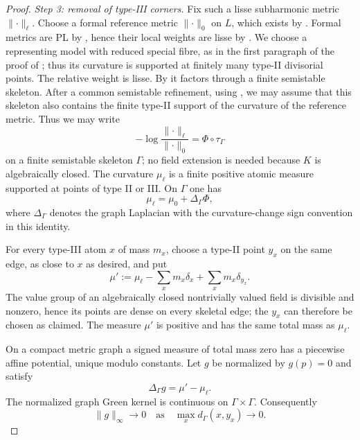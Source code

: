 \begin{proof}
\emph{Step 3: removal of type-III corners.}
Fix such a lisse subharmonic metric
\(\lVert\cdot\rVert_\ell\). Choose a formal reference metric
\(\lVert\cdot\rVert_0\) on \(L\), which exists by
\cite[\S2.2]{GM19}. Formal metrics are PL by
\cite[Prop.~2.10]{GM19}, hence their local weights are lisse by
\cite[Prop.~3.2.5]{Thu05}. We choose a representing model with reduced
special fibre, as in the first paragraph of the proof of
\cite[Prop.~5.1]{GR25PL}; thus its curvature is supported at finitely many
type-II divisorial points. The relative weight is
lisse. By \cite[Prop.~3.2.4]{Thu05} it factors through a finite semistable
skeleton. After a common semistable refinement, using
\cite[Lem.~2.2.22]{Thu05}, we may assume that this skeleton also contains
the finite type-II support of the curvature of the reference metric. Thus
we may write
\[
 -\log\frac{\lVert\cdot\rVert_\ell}
                 {\lVert\cdot\rVert_0}=\Phi\circ\tau_\Gamma
\]
on a finite semistable skeleton \(\Gamma\); no field extension is needed
because \(K\) is algebraically closed. The curvature \(\mu_\ell\) is a finite positive
atomic measure supported at points of type II or III. On \(\Gamma\) one has
\[
                 \mu_\ell=\mu_0+\Delta_\Gamma\Phi,
\]
where \(\Delta_\Gamma\) denotes the graph Laplacian with the
curvature-change sign convention in this identity.

For every type-III atom \(x\) of mass \(m_x\), choose a type-II point
\(y_x\) on the same edge, as close to \(x\) as desired, and put
\[
 \mu':=\mu_\ell-
       \sum_xm_x\delta_x+\sum_xm_x\delta_{y_x}.
\]
The value group of an algebraically closed nontrivially valued field is
divisible and nonzero, hence its points are dense on every skeletal edge;
the \(y_x\) can therefore be chosen as claimed. The measure \(\mu'\) is
positive and has the same total mass as \(\mu_\ell\).

On a compact metric graph a signed measure of total mass zero has a
piecewise affine potential, unique modulo constants. Let \(g\) be
normalized by \(g(p)=0\) and satisfy
\[
                    \Delta_\Gamma g=\mu'-\mu_\ell.
\]
The normalized graph Green kernel is continuous on
\(\Gamma\times\Gamma\). Consequently
\[
 \lVert g\rVert_\infty\longrightarrow0
\quad\text{as}\quad
 \max_x d_\Gamma(x,y_x)\longrightarrow0.
\]


\end{proof}
